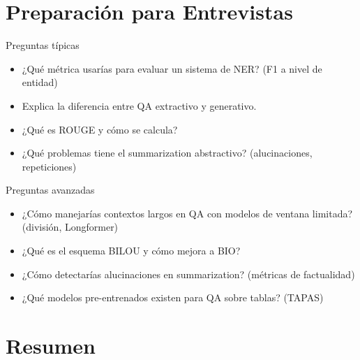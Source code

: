 \documentclass[aspectratio=169, 10pt, xcolor=table]{beamer}
\begin{document}
\section{Preparación para Entrevistas}

\begin{frame}{Preguntas típicas}
    \begin{itemize}
        \item ¿Qué métrica usarías para evaluar un sistema de NER? (F1 a nivel de entidad)
        \item Explica la diferencia entre QA extractivo y generativo.
        \item ¿Qué es ROUGE y cómo se calcula?
        \item ¿Qué problemas tiene el summarization abstractivo? (alucinaciones, repeticiones)
    \end{itemize}
\end{frame}

\begin{frame}{Preguntas avanzadas}
    \begin{itemize}
        \item ¿Cómo manejarías contextos largos en QA con modelos de ventana limitada? (división, Longformer)
        \item ¿Qué es el esquema BILOU y cómo mejora a BIO?
        \item ¿Cómo detectarías alucinaciones en summarization? (métricas de factualidad)
        \item ¿Qué modelos pre-entrenados existen para QA sobre tablas? (TAPAS)
    \end{itemize}
\end{frame}



\section{Resumen}
\end{document}
